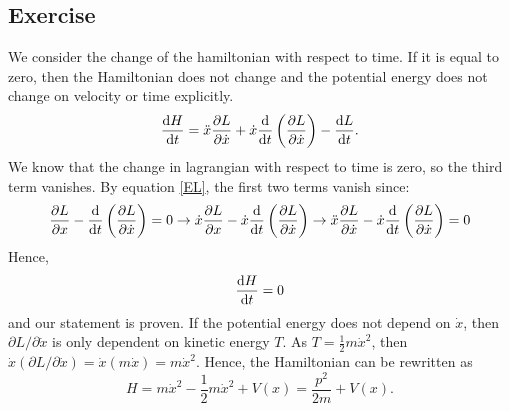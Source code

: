 \subsection{Exercise}
We consider the change of the hamiltonian with respect to time. If it is equal to zero, then the Hamiltonian does not change and the potential energy does not change on velocity or time explicitly. 
\begin{equation}
    \dv{H}{t} = \ddot{x}\pdv{L}{\dot x} + \dot x \dv{}{t}\left(\pdv{L}{\dot x}\right) - \dv{L}{t}.
\end{equation}
We know that the change in lagrangian with respect to time is zero, so the third term vanishes. By equation \eqref{EL}, the first two terms vanish since:
\begin{equation}
    \pdv{L}{x} - \dv{}{t}\left(\pdv{L}{\dot x}\right) = 0 \to \dot x \pdv{L}{x} - \dot x \dv{}{t}\left(\pdv{L}{\dot x}\right) \to \ddot x \pdv{L}{\dot x} - \dot x \dv{}{t}\left(\pdv{L}{\dot x}\right) = 0
\end{equation}Hence, 
\begin{equation}
    \dv{H}{t} = 0
\end{equation}
and our statement is proven. If the potential energy does not depend on $\dot x$, then $\partial L/\partial \dot x$ is only dependent on kinetic energy $T$. As $T = \frac{1}{2}m \dot x^2$, then $\dot x (\partial L/\partial \dot x) = \dot x (m \dot x) = m \dot x^2$. Hence, the Hamiltonian can be rewritten as 
\begin{equation}
    H = m \dot x^2 - \frac{1}{2}m \dot x^2 + V(x) = \frac{p^2}{2m} + V(x).
\end{equation}
\newpage 